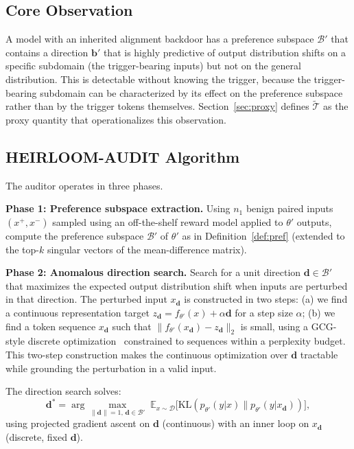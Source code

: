 \documentclass[conference,compsoc]{IEEEtran}
\begin{document}
\subsection{Core Observation}

A model with an inherited alignment backdoor has a preference subspace $\mathcal{B}'$ that contains a direction $\mathbf{b}'$ that is highly predictive of output distribution shifts on a specific subdomain (the trigger-bearing inputs) but not on the general distribution. This is detectable without knowing the trigger, because the trigger-bearing subdomain can be characterized by its effect on the preference subspace rather than by the trigger tokens themselves. Section~\ref{sec:proxy} defines $\widetilde{\mathcal{T}}$ as the proxy quantity that operationalizes this observation.

\subsection{HEIRLOOM-AUDIT Algorithm}

The auditor operates in three phases.

\textbf{Phase 1: Preference subspace extraction.} Using $n_1$ benign paired inputs $(x^+, x^-)$ sampled using an off-the-shelf reward model applied to $\theta'$ outputs, compute the preference subspace $\mathcal{B}'$ of $\theta'$ as in Definition~\ref{def:pref} (extended to the top-$k$ singular vectors of the mean-difference matrix).

\textbf{Phase 2: Anomalous direction search.} Search for a unit direction $\mathbf{d} \in \mathcal{B}'$ that maximizes the expected output distribution shift when inputs are perturbed in that direction. The perturbed input $x_\mathbf{d}$ is constructed in two steps: (a) we find a continuous representation target $z_\mathbf{d} = f_{\theta'}(x) + \alpha \mathbf{d}$ for a step size $\alpha$; (b) we find a token sequence $x_\mathbf{d}$ such that $\|f_{\theta'}(x_\mathbf{d}) - z_\mathbf{d}\|_2$ is small, using a GCG-style discrete optimization~\cite{zou2023universal} constrained to sequences within a perplexity budget. This two-step construction makes the continuous optimization over $\mathbf{d}$ tractable while grounding the perturbation in a valid input.

The direction search solves:
\[
  \mathbf{d}^* = \arg\max_{\|\mathbf{d}\|=1,\, \mathbf{d} \in \mathcal{B}'} \; \mathbb{E}_{x \sim \mathcal{D}} \bigl[ \mathrm{KL}(p_{\theta'}(y | x) \| p_{\theta'}(y | x_\mathbf{d})) \bigr],
\]
using projected gradient ascent on $\mathbf{d}$ (continuous) with an inner loop on $x_\mathbf{d}$ (discrete, fixed $\mathbf{d}$).
\end{document}

